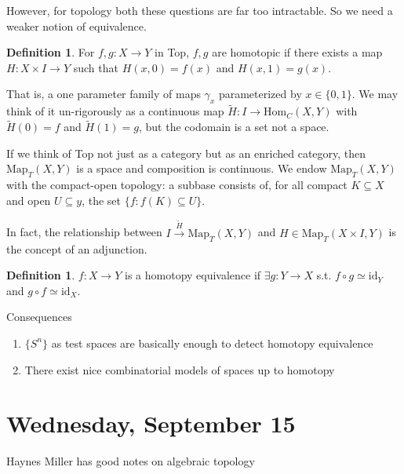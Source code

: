 \documentclass[10pt]{article}
\theoremstyle{definition}
\newtheorem{definition}[theorem]{Definition}
\begin{document}
	However, for topology both these questions are far too intractable. So we need a weaker notion of equivalence. 
	\begin{definition}
		For $f,g:X\to Y$ in Top, $f,g$ are homotopic if there exists a map $H:X\times I\to Y$ such that  $H(x,0)=f(x)$ and $H(x,1)=g(x)$.
	\end{definition}
	That is, a one parameter family of maps $\gamma_{x}$ parameterized by $x\in\{0,1\}$. We may think of it un-rigorously as a continuous map $\tilde{H}:I\to\text{Hom}_{C}(X,Y)$ with $\tilde{H}(0)=f$ and $\tilde{H}(1)=g$, but the codomain is a set not a space. 
	
	If we think of Top not just as a category but as an enriched category, then $\text{Map}_T(X,Y)$ is a space and composition is continuous. We endow $\text{Map}_T(X,Y)$ with the compact-open topology: a subbase consists of, for all compact $K\subseteq X$ and open $U\subseteq y$, the set $\{f:f(K)\subseteq U\}$.
	
	In fact, the relationship between $I\xrightarrow{\tilde{H}}\text{Map}_T(X,Y)$ and $H\in\text{Map}_T(X\times I,Y)$ is the concept of an adjunction.
	\begin{definition}
		$f:X\to Y$ is a homotopy equivalence if $\exists g: Y\to X$ s.t. $f\circ g\simeq \text{id}_{Y}$ and $g\circ f\simeq \text{id}_{X}$.
	\end{definition}
	Consequences 
	\begin{enumerate}
		\item $\{S^n\}$ as test spaces are basically enough to detect homotopy equivalence 
		\item There exist nice combinatorial models of spaces up to homotopy 
	\end{enumerate}
	
	\section{Wednesday, September 15}
	Haynes Miller has good notes on algebraic topology
	
\end{document}

